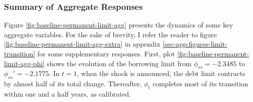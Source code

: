 \documentclass[12pt]{article} %
\numberwithin{equation}{section} %
\numberwithin{figure}{section}
\numberwithin{table}{section}
\begin{document}
\subsubsection{Summary of Aggregate Responses}
\label{sec:limit-transition-summ}

Figure \ref{fig:baseline-permanent-limit-agg} presents the dynamics of some key aggregate variables. For the sake of brevity, I refer the reader to figure \ref{fig:baseline-permanent-limit-agg-extra} in appendix \ref{sec-app:figures-limit-transition} for some supplementary responses. First, plot \ref{fig:baseline-permanent-limit-agg-phi} shows the evolution of the borrowing limit from $\phi_{ss} = -2.3485$ to $\phi_{ss}' = -2.1775$. In $t=1$, when the shock is announced, the debt limit contracts by almost half of its total change. Thereafter, $\phi_t$ completes most of its transition within one and a half years, as calibrated.
\end{document}
